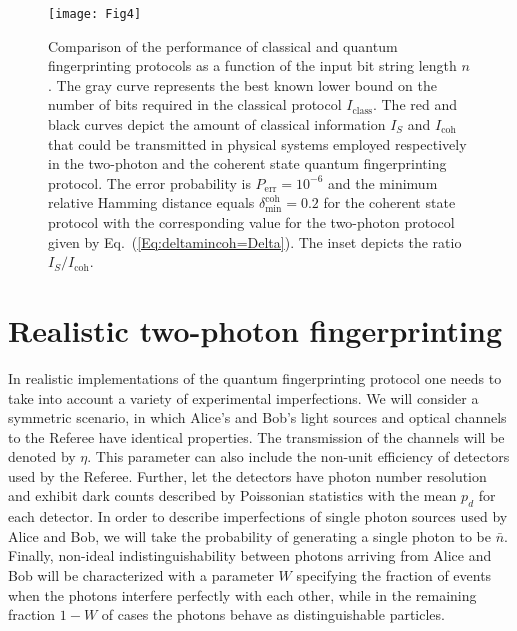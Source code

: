 \documentclass[10pt]{article}
\begin{document}
\begin{figure}[bt]
\texttt{[image: Fig4]}\centering\caption{Comparison of the performance of classical and quantum fingerprinting protocols as a function of the input bit string length $n$. The gray curve represents the best known lower bound on the number of bits required in the classical protocol $I_{\textrm{class}}$. The red and black curves depict the amount of classical information $I_{S}$ and $I_{\text{coh}}$ that could be transmitted in physical systems employed respectively in the two-photon and the coherent state quantum fingerprinting protocol. The error probability is $P_{\text{err}}=10^{-6}$ and the minimum relative Hamming distance equals $\delta^{\text{coh}}_{\text{min}}=0.2$ for the coherent state protocol with the corresponding value for the two-photon protocol given by Eq.~(\ref{Eq:deltamincoh=Delta}). The inset depicts the ratio $I_{S}/I_{\text{coh}}$.\label{fig:information}}
\end{figure}


\section{Realistic two-photon fingerprinting}
\label{Sec:realistic}

In realistic implementations of the quantum fingerprinting protocol one needs to
take into account a variety of experimental imperfections. We will consider a symmetric scenario, in which Alice's and Bob's light sources and optical channels to the Referee have identical properties. The transmission of the channels will be denoted by $\eta$. This parameter can also include the non-unit efficiency of detectors used by the Referee. Further, let the detectors have photon number resolution and exhibit dark counts described by Poissonian statistics with the mean $p_d$ for each detector. In order to describe imperfections of single photon sources used by Alice and Bob, we will take the probability of generating a single photon to be $\bar{n}$. Finally, non-ideal indistinguishability between photons arriving from Alice and Bob will be characterized with a parameter $W$ specifying the fraction of events when the photons interfere perfectly with each other, while in the remaining fraction $1-W$ of cases the photons behave as distinguishable particles.
\end{document}
